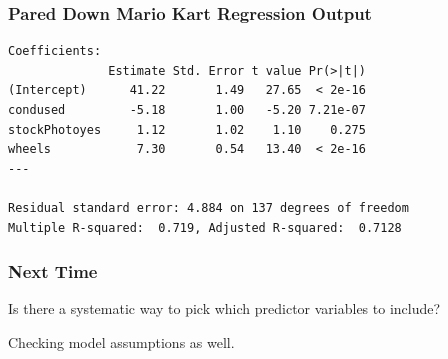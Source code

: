 \documentclass[handout]{beamer}
\begin{document}
\begin{frame}[fragile]
\frametitle{Pared Down Mario Kart Regression Output}

\begin{small}
\begin{verbatim}
Coefficients:
              Estimate Std. Error t value Pr(>|t|)    
(Intercept)      41.22       1.49   27.65  < 2e-16
condused         -5.18       1.00   -5.20 7.21e-07
stockPhotoyes     1.12       1.02    1.10    0.275    
wheels            7.30       0.54   13.40  < 2e-16
---

Residual standard error: 4.884 on 137 degrees of freedom
Multiple R-squared:  0.719,	Adjusted R-squared:  0.7128 
\end{verbatim}
\end{small}

\end{frame}


\begin{frame}[fragile]
\frametitle{Next Time}

Is there a systematic way to pick which predictor variables to include?

\pause\vspace{0.5cm}

Checking model assumptions as well.  

\end{frame}
\end{document}
